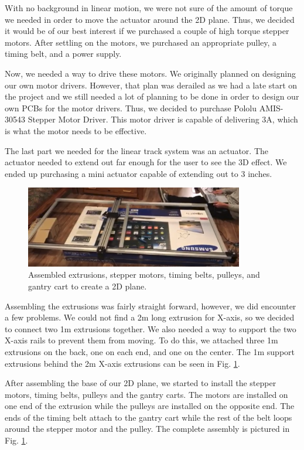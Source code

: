 \documentclass[12pt]{article}
\begin{document}
With no background in linear motion, we were not sure of the amount of torque we needed in order to move the actuator around the 2D plane. Thus, we decided it would be of our best interest if we purchased a couple of high torque stepper motors. After settling on the motors, we purchased an appropriate pulley, a timing belt, and a power supply.

Now, we needed a way to drive these motors. We originally planned on designing our own motor drivers. However, that plan was derailed as we had a late start on the project and we still needed a lot of planning to be done in order to design our own PCBs for the motor drivers. Thus, we decided to purchase Pololu AMIS-30543 Stepper Motor Driver. This motor driver is capable of delivering 3A, which is what the motor needs to be effective. 

The last part we needed for the linear track system was an actuator. The actuator needed to extend out far enough for the user to see the 3D effect. We ended up purchasing a mini actuator capable of extending out to 3 inches.

\begin{figure}[H]
  \centering
  \includegraphics[width=0.85\textwidth]{image2.png}
  \caption{Assembled extrusions, stepper motors, timing belts, pulleys, and gantry cart to create a 2D plane.}
  \label{fig:lineartracks}
\end{figure}

Assembling the extrusions was fairly straight forward, however, we did encounter a few problems. We could not find a 2m long extrusion for X-axis, so we decided to connect two 1m extrusions together. We also needed a way to support the two X-axis rails to prevent them from moving. To do this, we attached three 1m extrusions on the back, one on each end, and one on the center. The 1m support extrusions behind the 2m X-axis extrusions can be seen in Fig. \ref{fig:lineartracks}.

After assembling the base of our 2D plane, we started to install the stepper motors, timing belts, pulleys and the gantry carts. The motors are installed on one end of the extrusion while the pulleys are installed on the opposite end. The ends of the timing belt attach to the gantry cart while the rest of the belt loops around the stepper motor and the pulley. The complete assembly is pictured in Fig. \ref{fig:lineartracks}.
\end{document}
